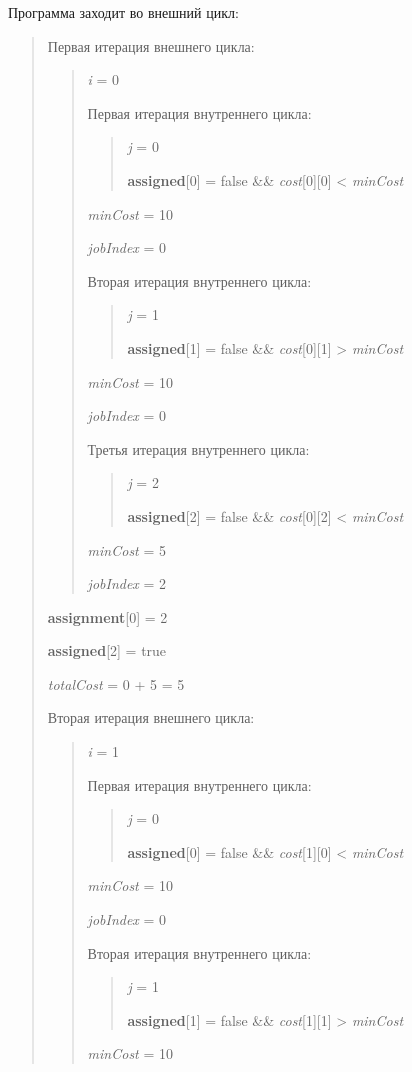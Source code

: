 \documentclass[]{article}
\begin{document}
Программа заходит во внешний цикл:
\begin{quote}
Первая итерация внешнего цикла:
\begin{quote}
\emph{i} = 0

Первая итерация внутреннего цикла:
\begin{quote}
\emph{j} = 0

\textbf{assigned}{[}0{]} = false \&\& \emph{cost}{[}0{]}{[}0{]}
\textless{} \emph{minCost}
\end{quote}
\emph{minCost} = 10

\emph{jobIndex} = 0

Вторая итерация внутреннего цикла:
\begin{quote}

\emph{j} = 1


\textbf{assigned}{[}1{]} = false \&\& \emph{cost}{[}0{]}{[}1{]}
\textgreater{} \emph{minCost}
\end{quote}
\emph{minCost} = 10

\emph{jobIndex} = 0

Третья итерация внутреннего цикла:
\begin{quote}

\emph{j} = 2


\textbf{assigned}{[}2{]} = false \&\& \emph{cost}{[}0{]}{[}2{]}
\textless{} \emph{minCost}
\end{quote}
\emph{minCost} = 5

\emph{jobIndex} = 2
\end{quote}
\textbf{assignment}{[}0{]} = 2

\textbf{assigned}{[}2{]} = true

\emph{totalCost} = 0 + 5 = 5

Вторая итерация внешнего цикла:
\begin{quote}
\emph{i} = 1

Первая итерация внутреннего цикла:
\begin{quote}
\emph{j} = 0

\textbf{assigned}{[}0{]} = false \&\& \emph{cost}{[}1{]}{[}0{]}
\textless{} \emph{minCost}
\end{quote}
\emph{minCost} = 10

\emph{jobIndex} = 0

Вторая итерация внутреннего цикла:

\begin{quote}
\emph{j} = 1


\textbf{assigned}{[}1{]} = false \&\& \emph{cost}{[}1{]}{[}1{]}
\textgreater{} \emph{minCost}
\end{quote}
\emph{minCost} = 10


\end{quote}
\end{quote}
\end{document}

